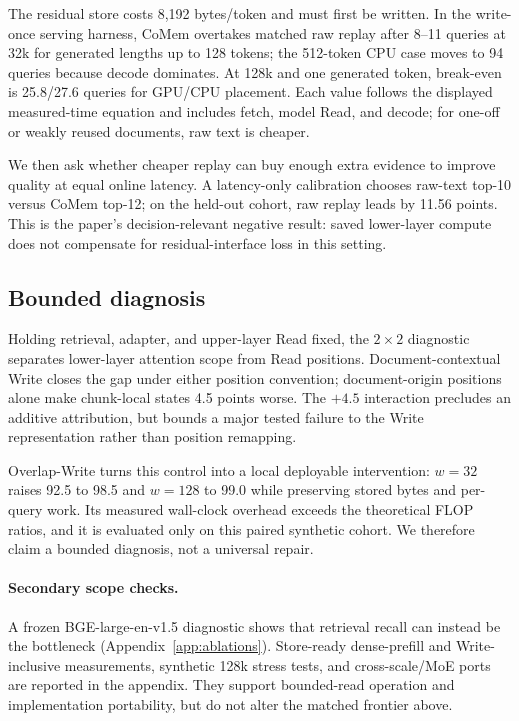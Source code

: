 The residual store costs 8,192 bytes/token and must first be written. In the
write-once serving harness, CoMem overtakes matched raw replay after 8--11
queries at 32k for generated lengths up to 128 tokens; the 512-token CPU case
moves to 94 queries because decode dominates. At 128k and one generated token,
break-even is 25.8/27.6 queries for GPU/CPU placement. Each value follows the
displayed measured-time equation and includes fetch, model Read, and decode;
for one-off or weakly reused documents, raw text is cheaper.



We then ask whether cheaper replay can buy enough extra evidence to improve
quality at equal online latency. A latency-only calibration chooses raw-text
top-10 versus CoMem top-12; on the held-out cohort, raw replay leads by 11.56
points. This is the paper's decision-relevant negative result: saved lower-layer
compute does not compensate for residual-interface loss in this setting.

\subsection{Bounded diagnosis}



Holding retrieval, adapter, and upper-layer Read fixed, the $2{\times}2$
diagnostic separates lower-layer attention scope from Read positions.
Document-contextual Write closes the gap under either position convention;
document-origin positions alone make chunk-local states 4.5 points worse. The
$+4.5$ interaction precludes an additive attribution, but bounds a major tested
failure to the Write representation rather than position remapping.

Overlap-Write turns this control into a local deployable intervention:
$w{=}32$ raises 92.5 to 98.5 and $w{=}128$ to 99.0 while preserving stored
bytes and per-query work. Its measured wall-clock overhead exceeds the
theoretical FLOP ratios, and it is evaluated only on this paired synthetic
cohort. We therefore claim a bounded diagnosis, not a universal repair.

\paragraph{Secondary scope checks.}
A frozen BGE-large-en-v1.5 diagnostic shows that retrieval recall can instead be
the bottleneck (Appendix~\ref{app:ablations}). Store-ready dense-prefill and
Write-inclusive measurements, synthetic 128k stress tests, and cross-scale/MoE
ports are reported in the appendix. They support bounded-read operation and
implementation portability, but do not alter the matched frontier above.
